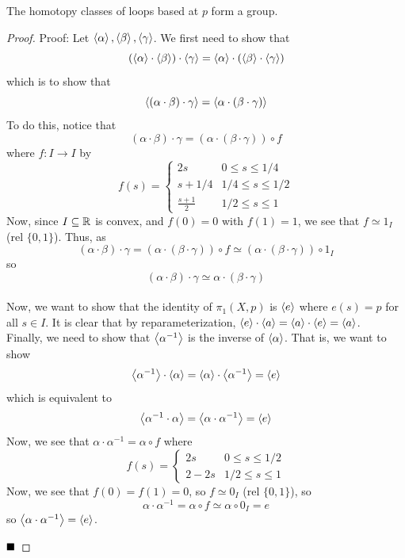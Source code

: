 
\begin{theorem}
    The homotopy classes of loops based at $p$ form a group.
\end{theorem}
\begin{proof}{Proof:}
    Let $\left\langle {\alpha} \right\rangle, \left\langle {\beta} \right\rangle, \left\langle {\gamma} \right\rangle$. We first need to show that
    \[ (\left\langle {\alpha} \right\rangle \cdot \left\langle {\beta} \right\rangle) \cdot \left\langle {\gamma} \right\rangle = \left\langle {\alpha} \right\rangle \cdot (\left\langle {\beta} \right\rangle \cdot \left\langle {\gamma} \right\rangle) \]
    which is to show that
    \[ \left\langle {(\alpha \cdot \beta) \cdot \gamma} \right\rangle = \left\langle {\alpha \cdot (\beta \cdot \gamma)} \right\rangle \]
    To do this, notice that
    \[ (\alpha \cdot \beta) \cdot \gamma = (\alpha \cdot (\beta \cdot \gamma)) \circ f \]
    where $f : I \to I$ by
    \[ f(s) = \left\{\begin{matrix} 2s & 0 \leq s \leq 1/4 \\ s + 1/4 & 1/4 \leq s \leq 1/2 \\ \frac{s + 1}{2} & 1/2 \leq s \leq 1\end{matrix}\right. \]
    Now, since $I \subseteq \mathbb{R}$ is convex, and $f(0) = 0$ with $f(1) = 1$, we see that $f \simeq 1_{I}$ (rel $\{0, 1\}$). Thus, as
    \[ (\alpha \cdot \beta) \cdot \gamma = (\alpha \cdot (\beta \cdot \gamma)) \circ f \simeq (\alpha \cdot (\beta \cdot \gamma)) \circ 1_{I} \]
    so
    \[ (\alpha \cdot \beta) \cdot \gamma \simeq \alpha \cdot (\beta \cdot \gamma) \]\\

    Now, we want to show that the identity of $\pi_1(X, p)$ is $\left\langle {e} \right\rangle$ where $e(s) = p$ for all $s \in I$. It is clear that by reparameterization, $\left\langle {e} \right\rangle \cdot \left\langle {a} \right\rangle = \left\langle {a} \right\rangle \cdot \left\langle {e} \right\rangle = \left\langle {a} \right\rangle$.\\

    Finally, we need to show that $\left\langle {\alpha^{-1}} \right\rangle$ is the inverse of $\left\langle {\alpha} \right\rangle$. That is, we want to show
    \[ \left\langle {\alpha^{-1}} \right\rangle \cdot \left\langle {\alpha} \right\rangle = \left\langle {\alpha} \right\rangle \cdot \left\langle {\alpha^{-1}} \right\rangle = \left\langle {e} \right\rangle \]
    which is equivalent to
    \[ \left\langle {\alpha^{-1} \cdot \alpha} \right\rangle = \left\langle {\alpha \cdot \alpha^{-1}} \right\rangle = \left\langle {e} \right\rangle \]
    Now, we see that $\alpha \cdot \alpha^{-1} = \alpha \circ f$ where
    \[ f(s) = \left\{\begin{matrix} 2s & 0 \leq s \leq 1/2 \\ 2 - 2s & 1/2 \leq s \leq 1\end{matrix}\right. \]
    Now, we see that $f(0) = f(1) = 0$, so $f \simeq 0_{I}$ (rel $\{0, 1\}$), so
    \[ \alpha \cdot \alpha^{-1} = \alpha \circ f \simeq \alpha \circ 0_{I} = e \]
    so $\left\langle {\alpha \cdot \alpha^{-1}} \right\rangle = \left\langle {e} \right\rangle$. 

    $\qed$
\end{proof}

